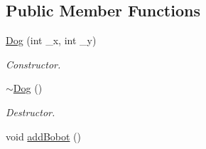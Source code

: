 \subsection*{Public Member Functions}
\begin{DoxyCompactItemize}
\item 
\hyperlink{classDog_afcf29443cf093c134c3d2febf307d831}{Dog} (int \-\_\-x, int \-\_\-y)
\begin{DoxyCompactList}\small\item\em Constructor. \end{DoxyCompactList}\item 
\hypertarget{classDog_aeacf410641eab28eabea6bc5269eb4ef}{\hyperlink{classDog_aeacf410641eab28eabea6bc5269eb4ef}{$\sim$\-Dog} ()}\label{classDog_aeacf410641eab28eabea6bc5269eb4ef}

\begin{DoxyCompactList}\small\item\em Destructor. \end{DoxyCompactList}\item 
\hypertarget{classDog_a843dea97bbe95afc6dc4692fcaeb757a}{void \hyperlink{classDog_a843dea97bbe95afc6dc4692fcaeb757a}{add\-Bobot} ()}\label{classDog_a843dea97bbe95afc6dc4692fcaeb757a}


\end{DoxyCompactItemize}
